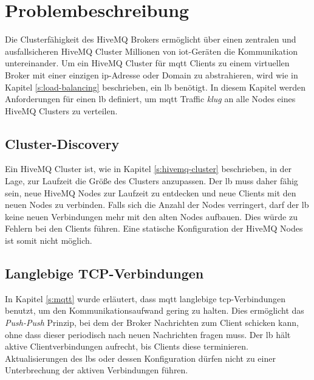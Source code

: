 \section{Problembeschreibung} \label{s:problem}
Die Clusterfähigkeit des HiveMQ Brokers ermöglicht über einen zentralen und ausfallsicheren HiveMQ Cluster Millionen von \ac{iot}-Geräten die Kommunikation untereinander.
Um ein HiveMQ Cluster für \ac{mqtt} Clients zu einem virtuellen Broker mit einer einzigen \ac{ip}-Adresse oder Domain zu abstrahieren, wird wie in Kapitel \ref{s:load-balancing} beschrieben, ein \acl{lb} benötigt.
In diesem Kapitel werden Anforderungen für einen \acl{lb} definiert, um \ac{mqtt} Traffic \textit{klug} an alle Nodes eines HiveMQ Clusters zu verteilen.

\subsection{Cluster-Discovery} \label{sp:cluster-discovery}
Ein HiveMQ Cluster ist, wie in Kapitel \ref{s:hivemq-cluster} beschrieben, in der Lage, zur Laufzeit die Grö{\ss}e des Clusters anzupassen. Der \acl{lb} muss daher fähig sein, neue HiveMQ Nodes zur Laufzeit zu entdecken und neue Clients mit den neuen Nodes zu verbinden. Falls sich die Anzahl der Nodes verringert, darf der \acl{lb} keine neuen Verbindungen mehr mit den alten Nodes aufbauen. Dies würde zu Fehlern bei den Clients führen.
Eine statische Konfiguration der HiveMQ Nodes ist somit nicht möglich.

\subsection{Langlebige TCP-Verbindungen}
In Kapitel \ref{s:mqtt} wurde erläutert, dass \ac{mqtt} langlebige \ac{tcp}-Verbindungen benutzt, um den Kommunikationsaufwand gering zu halten.
Dies ermöglicht das \textit{Push-Push} Prinzip, bei dem der Broker Nachrichten zum Client schicken kann, ohne dass dieser periodisch nach neuen Nachrichten fragen muss.
Der \acl{lb} hält aktive Clientverbindungen aufrecht, bis Clients diese terminieren.
Aktualisierungen des \aclp{lb} oder dessen Konfiguration dürfen nicht zu einer Unterbrechung der aktiven Verbindungen führen.

